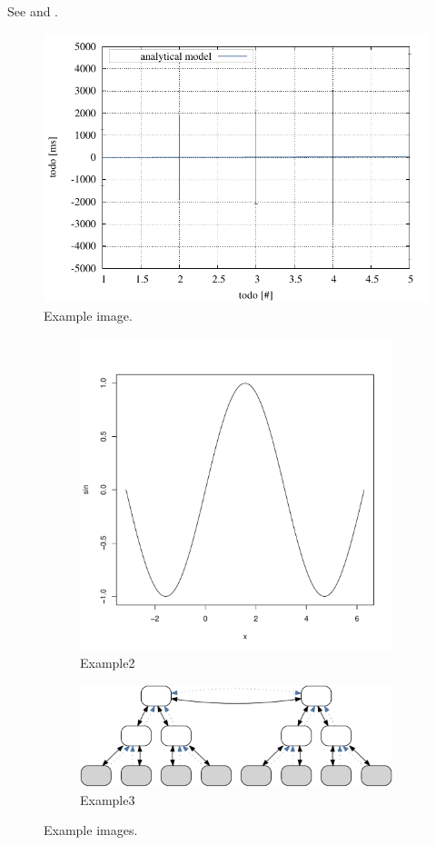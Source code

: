 See  and .

\begin{figure}
    \centering
    \includegraphics[width=.45\textwidth]{resources/images/example1.pdf} 
    \caption{Example image.}\label{fig:example1}
\end{figure}

\begin{figure}
    \begin{subfigure}[b]{.5\textwidth}
    	\centering
		\includegraphics[width=.5\textwidth]{resources/images/example2.pdf}
		\caption{Example2}\label{fig:example2}
    \end{subfigure}
    \begin{subfigure}[b]{.5\textwidth}
    	\centering
		\includegraphics[width=.5\textwidth]{resources/images/example3.pdf}
		\caption{Example3}\label{fig:example3}
    \end{subfigure}    
    \caption{Example images.}\label{fig:exammple2_3}
\end{figure}
